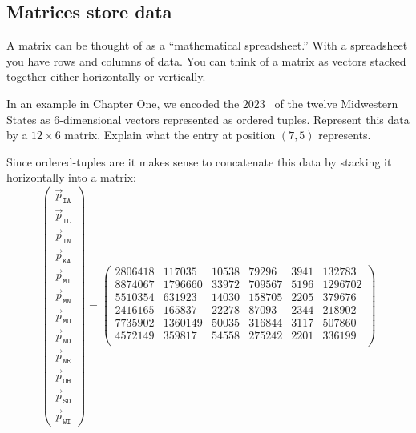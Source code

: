 \documentclass{ximera}
\begin{document}
\subsection{Matrices store data}


A matrix can be thought of as a ``mathematical spreadsheet.'' With a
spreadsheet you have rows and columns of data.  You can think of a
matrix as vectors stacked together either horizontally
or vertically.

\begin{example} %
  In an example in Chapter One, we encoded the $2023$
  ~of
  the twelve Midwestern States as $6$-dimensional vectors represented
  as ordered tuples. Represent this data by a $12\times 6$
  matrix. Explain what the entry at position $(7,5)$ represents.
  \begin{explanation}
  Since ordered-tuples are  it makes sense to
  concatenate this data by stacking it horizontally into a matrix:
  \[
  \begin{pmatrix}
  \vec{p}_{\texttt{IA}} \\
  \vec{p}_{\texttt{IL}} \\
  \vec{p}_{\texttt{IN}} \\
  \vec{p}_{\texttt{KA}} \\
  \vec{p}_{\texttt{MI}} \\
  \vec{p}_{\texttt{MN}} \\
  \vec{p}_{\texttt{MO}} \\
  \vec{p}_{\texttt{ND}} \\
  \vec{p}_{\texttt{NE}} \\
  \vec{p}_{\texttt{OH}} \\
  \vec{p}_{\texttt{SD}} \\
  \vec{p}_{\texttt{WI}}
  \end{pmatrix}
  =
  \begin{pmatrix}
  2806418 & 117035 & 10538 & 79296 & 3941 & 132783\\
  8874067 & 1796660 & 33972 & 709567 & 5196 & 1296702\\
  5510354 & 631923 & 14030 & 158705 & 2205 & 379676\\
  2416165 & 165837 & 22278 & 87093 & 2344 & 218902\\
  7735902 & 1360149 & 50035 & 316844 & 3117 & 507860\\
  4572149 & 359817 & 54558 & 275242 & 2201 & 336199\\

\end{pmatrix}\]
\end{explanation}
\end{example}
\end{document}
